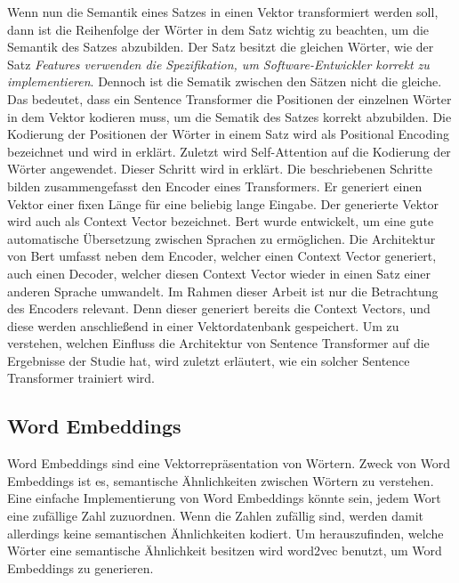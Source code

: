 Wenn nun die Semantik eines Satzes in einen Vektor transformiert werden soll, dann ist die Reihenfolge der Wörter in dem Satz wichtig zu beachten, um die Semantik des Satzes abzubilden.
Der Satz  besitzt die gleichen Wörter, wie der Satz \textit{Features verwenden die Spezifikation, um Software-Entwickler korrekt zu implementieren}.
Dennoch ist die Sematik zwischen den Sätzen nicht die gleiche.
Das bedeutet, dass ein Sentence Transformer die Positionen der einzelnen Wörter in dem Vektor kodieren muss, um die Sematik des Satzes korrekt abzubilden.
Die Kodierung der Positionen der Wörter in einem Satz wird als Positional Encoding bezeichnet und wird in  erklärt.
Zuletzt wird Self-Attention auf die Kodierung der Wörter angewendet.
Dieser Schritt wird in  erklärt.
Die beschriebenen Schritte bilden zusammengefasst den Encoder eines Transformers.
Er generiert einen Vektor einer fixen Länge für eine beliebig lange Eingabe.
Der generierte Vektor wird auch als Context Vector bezeichnet.
Bert wurde entwickelt, um eine gute automatische Übersetzung zwischen Sprachen zu ermöglichen.
Die Architektur von Bert umfasst neben dem Encoder, welcher einen Context Vector generiert, auch einen Decoder, welcher diesen Context Vector wieder in einen Satz einer anderen Sprache umwandelt.
Im Rahmen dieser Arbeit ist nur die Betrachtung des Encoders relevant.
Denn dieser generiert bereits die Context Vectors, und diese werden anschließend in einer Vektordatenbank gespeichert.
Um zu verstehen, welchen Einfluss die Architektur von Sentence Transformer auf die Ergebnisse der Studie hat, wird zuletzt erläutert, wie ein solcher Sentence Transformer trainiert wird.

\subsection{Word Embeddings}
\label{chap:word-embeddings}
Word Embeddings sind eine Vektorrepräsentation von Wörtern.
Zweck von Word Embeddings ist es, semantische Ähnlichkeiten zwischen Wörtern zu verstehen.
Eine einfache Implementierung von Word Embeddings könnte sein, jedem Wort eine zufällige Zahl zuzuordnen.
Wenn die Zahlen zufällig sind, werden damit allerdings keine semantischen Ähnlichkeiten kodiert.
Um herauszufinden, welche Wörter eine semantische Ähnlichkeit besitzen wird word2vec benutzt, um Word Embeddings zu generieren.\\

